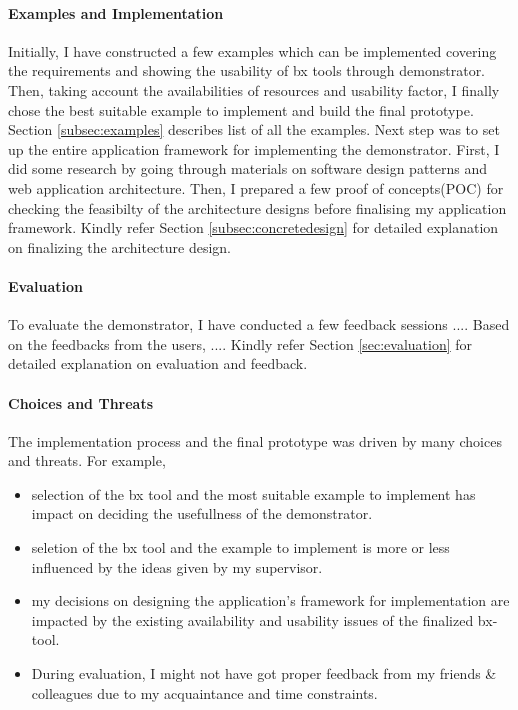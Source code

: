 \paragraph{Examples and Implementation}
Initially, I have constructed a few examples which can be implemented covering the requirements and showing the usability of bx tools through demonstrator. Then, taking account the availabilities of resources and usability factor, I finally chose the best suitable example to implement and build the final prototype. Section \ref{subsec:examples} describes list of all the examples.
\newline\newline Next step was to set up the entire application framework for implementing the demonstrator. First, I did some research by going through materials on software design patterns and web application architecture. Then, I prepared a few proof of concepts(POC) for checking the feasibilty of the architecture designs before finalising my application framework. Kindly refer Section \ref{subsec:concretedesign} for detailed explanation on finalizing the architecture design.
\paragraph{Evaluation} To evaluate the demonstrator, I have conducted a few feedback sessions ....
\newline\newline Based on the feedbacks from the users, .... Kindly refer Section \ref{sec:evaluation} for detailed explanation on evaluation and feedback.
\paragraph{Choices and Threats} 
The implementation process and the final prototype was driven by many choices and threats. For example, 
\begin{itemize} 
	\item {selection of the bx tool and the most suitable example to implement has impact on deciding the usefullness of the demonstrator.}
	\item {seletion of the bx tool and the example to implement is more or less influenced by the ideas given by my supervisor.} 
	\item {my decisions on designing the application's framework for implementation are impacted by the existing availability and usability issues of the finalized bx-tool.}
	\item {During evaluation, I might not have got proper feedback from my friends \& colleagues due to my acquaintance and time constraints.}
\end{itemize}

